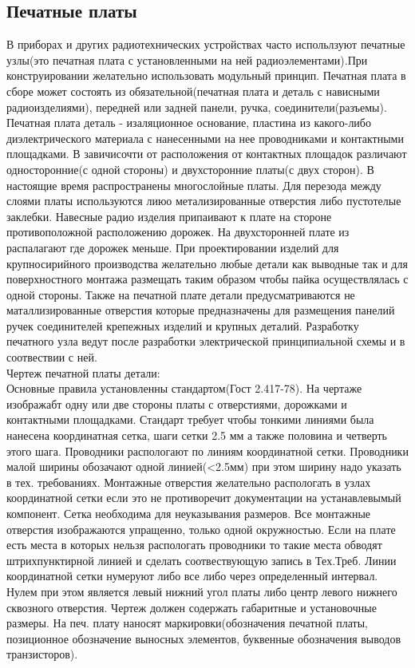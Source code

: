 \documentclass[a4paper, 12pt]{article}
\begin{document}
\newpage
\subsection{Печатные платы}
В приборах и других радиотехнических устройствах часто испольлзуют печатные узлы(это печатная плата с установленными на ней радиоэлементами).При конструировании желательно использовать модульный принцип. Печатная плата в сборе может состоять из обязательной(печатная плата и деталь с нависными радиоизделиями), передней или задней панели, ручка, соединители(разъемы).\\

Печатная плата деталь - изаляционное основание, пластина из какого-либо диэлектрического материала с нанесенными на нее проводниками и контактными площадками. В завичисочти от расположения от контактных площадок различают односторонние(с одной стороны) и двухсторонние платы(с двух сторон). В настоящие время распространены многослойные платы. Для перезода между слоями платы используются лиюо метализированные отверстия либо пустотелые заклебки. Навесные радио изделия припаивают к плате на стороне противоположной расположению дорожек. На двухсторонней плате из распалагают где дорожек меньше. При проектировании изделий для крупносирийного производства желательно любые детали как выводные так и для поверхностного монтажа размещать таким образом чтобы пайка осуществлялась с одной стороны. Также на печатной плате детали предусматриваются не маталлизированные отверстия которые предназначены для размещения панелий ручек соединителей крепежных изделий и крупных деталий. Разработку печатного узла ведут после разработки электрической принципиальной схемы и в соотвествии с ней.\\

Чертеж печатной платы детали:\\
Основные правила установленны стандартом(Гост 2.417-78). На чертаже изображабт одну или две стороны платы с отверстиями, дорожками и контактными площадками. Стандарт требует чтобы тонкими линиями была нанесена координатная сетка, шаги сетки 2.5 мм а также половина и четверть этого шага. Проводники распологают по линиям координатной сетки. Проводники малой ширины обозачают одной линией(<2.5мм) при этом ширину надо указать в тех. требованиях. Монтажные отверстия желательно распологать в узлах координатной сетки если это не противоречит документации на устанавлевымый компонент. Сетка необходима для неуказывания размеров. Все монтажные отверстия изображаются упращенно, только одной окружностью. Если на плате есть места в которых нельзя распологать проводники то такие места обводят штрихпунктирной линией и сделать соотвествующую запись в Тех.Треб. Линии координатной сетки нумеруют либо все либо через определенный интервал. Нулем при этом является левый нижний угол платы либо центр левого нижнего сквозного отверстия. Чертеж должен содержать габаритные и установочные размеры. На печ. плату наносят маркировки(обозначения печатной платы, позиционное обозначение выносных элементов, буквенные обозначения выводов транзисторов). \\
\end{document}
